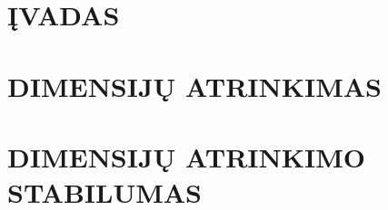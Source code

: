 \documentclass{article}
\begin{document}


\let \savenumberline \numberline
\def \numberline#1{\savenumberline{#1.}}
\tableofcontents 
\newpage

\section*{ĮVADAS}


\section{DIMENSIJŲ ATRINKIMAS}



\section{DIMENSIJŲ ATRINKIMO STABILUMAS}





\end{document}
